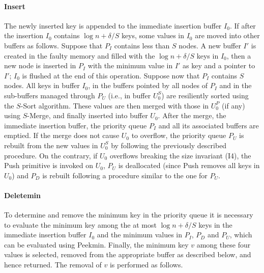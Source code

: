 \documentclass[review,number]{elsarticle}
\newcommand{\SMerge}{$S$-\textsf{Merge}}
\newcommand{\SSort}{$S$-\textsf{Sort}}
\newcommand{\Insert}{\textsf{Insert}}
\newcommand{\Deletemin}{\textsf{Deletemin}}
\newcommand{\Push}{\textsf{Push}}
\newcommand{\Peekmin}{\textsf{Peekmin}}
\begin{document}
\paragraph{\Insert{}} The newly inserted key is appended to the {immediate
insertion buffer} $I_{0}$. If after the insertion $I_{0}$ contains $\log n +
\delta / S$ keys, some values in $I_0$ are moved into other buffers as follows.
Suppose that $P_{I}$ contains less than $S$ nodes. A new buffer $I'$ is created
in the faulty memory and filled with the $\log n + \delta / S$ keys in
$I_{0}$, then a new node is inserted in $P_I$ with the minimum value in $I'$ as
key and a pointer to $I'$; $I_0$ is flushed at the end of this operation.
Suppose now that  $P_{I}$ contains $S$ nodes. All keys in buffer $I_0$, in the
buffers
pointed by all nodes of $P_I$ and in the sub-buffers managed through $P_U$
(i.e., in buffer $U^S_0$) are resiliently sorted using the \SSort{} algorithm.
These values are then merged with those in $U^P_{0}$ (if any)  using \SMerge{},
and finally inserted into buffer $U_{0}$. After the merge, the immediate
insertion buffer, the priority queue $P_{I}$ and all its associated buffers  are
emptied. If the merge does not cause $U_{0}$ to overflow, the priority queue
$P_{U}$  is rebuilt from the new values in $U_0^S$  by following the previously
described procedure.
On the contrary, if $U_{0}$ overflows breaking the size invariant (I4), the
\Push{} primitive is invoked on $U_{0}$, $P_{U}$ is deallocated (since \Push{}
removes all keys in $U_0$) and $P_{D}$ is rebuilt following a procedure similar
to the one for $P_{U}$. 


\paragraph{\Deletemin{}} To determine and remove the minimum key in the priority
queue it is necessary to evaluate the minimum key among the at most $\log n +
\delta / S$ keys in the immediate insertion buffer $I_{0}$ and the minimum
values in $P_{I}$, $P_{D}$ and $P_{U}$, which can be evaluated using \Peekmin{}.
Finally, the minimum key $v$ among these four values is selected, removed from
the appropriate buffer as described below, and hence returned. The removal of
$v$ is performed as follows.
\end{document}
